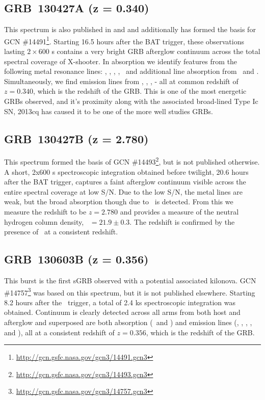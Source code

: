 \documentclass{aa}    %
\begin{document}
\subsection{GRB~130427A (z = 0.340)}

This spectrum is also published in \citet{Xu2013b} and \citet{Kruhler2015} and
additionally has formed the basis for GCN
\#14491\footnote{\url{http://gcn.gsfc.nasa.gov/gcn3/14491.gcn3}}. Starting 16.5
hours after the BAT trigger, these observations lasting $2 \times 600$ s
contains a very bright GRB afterglow continuum across the total spectral
coverage of X-shooter. In absorption we identify features from the following
metal resonance lines: \feii, \mnii, \mgii, \mgi, \TIii~and additional line
absorption from \caii~and \nai. Simultaneously, we find emission lines from \ha,
\hb, \oiii, \oii - all at common redshift of $z = 0.340$, which is the redshift
of the GRB. This is one of the most energetic GRBs observed, and it's proximity
along with the associated broad-lined Type Ic SN, 2013cq has caused it to be one
of the more well studies GRBs.

\subsection{GRB~130427B (z = 2.780)}

This spectrum formed the basis of GCN
\#14493\footnote{\url{http://gcn.gsfc.nasa.gov/gcn3/14493.gcn3}}, but is not
published otherwise. A short, 2x600 s spectroscopic integration obtained before
twilight, 20.6 hours after the BAT trigger, captures a faint afterglow continuum
visible across the entire spectral coverage at low S/N. Due to the low S/N, the
metal lines are weak, but the broad absorption though due to \lya~is detected.
From this we measure the redshift to be $z = 2.780$ and provides a measure of
the neutral hydrogen column density, \nh~$= 21.9 \pm 0.3$. The redshift is
confirmed by the presence of \feii~at a consistent redshift.

\subsection{GRB~130603B (z = 0.356)}

This burst is the first sGRB observed with a potential associated
kilonova\citep{Tanvir2013a, Berger2013a}.  GCN
\#14757\footnote{\url{http://gcn.gsfc.nasa.gov/gcn3/14757.gcn3}} was based on
this spectrum, but it is not published elsewhere. Starting 8.2 hours after the
\swift~trigger, a total of 2.4 ks spectroscopic integration was obtained.
Continuum is clearly detected across all arms from both host and afterglow and
superposed are both absorption (\cahk~and \mgii) and emission lines (\oii, \hb,
\oiii, \ha, and \sii), all at a consistent redshift of $z = 0.356$, which is the
redshift of the GRB.
\end{document}
